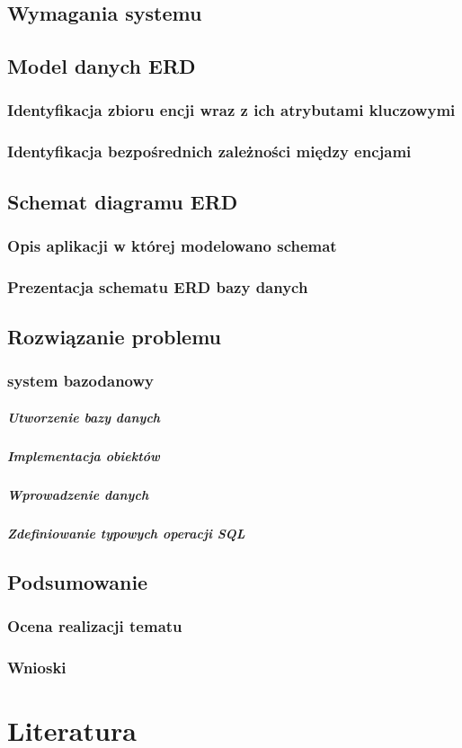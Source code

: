 \documentclass[polish, 11pt]{article}
\begin{document}
     

    \subsection{Wymagania systemu}
    
    \subsection{Model danych ERD}
		\subsubsection{Identyfikacja zbioru encji wraz z ich atrybutami kluczowymi}
	    
	    \subsubsection{Identyfikacja bezpośrednich zależności między encjami}
    
    \subsection{Schemat diagramu ERD}
	    \subsubsection{Opis aplikacji w której modelowano schemat}
	    
	    \subsubsection{Prezentacja schematu ERD bazy danych}

    \subsection{Rozwiązanie problemu}
	    \subsubsection{system bazodanowy}
		    \subparagraph{Utworzenie bazy danych}
		    
		    \subparagraph{Implementacja obiektów}
		    
		    \subparagraph{Wprowadzenie danych}
		    
		    \subparagraph{Zdefiniowanie typowych operacji SQL}

    \subsection{Podsumowanie}
	    \subsubsection{Ocena realizacji tematu}
	    
		\subsubsection{Wnioski}

\section{Literatura}
\end{document}
